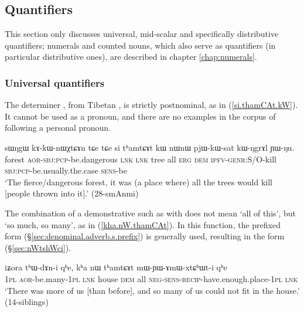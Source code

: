 \subsection{Quantifiers} \label{sec:quantifiers.determiners}
This section only discusses universal, mid-scalar and specifically distributive quantifiers; numerals and counted nouns, which also serve as quantifiers (in particular distributive ones), are described in chapter \ref{chap:numerals}.

\subsubsection{Universal quantifiers} \label{sec:universal.quant}
 
The determiner , from Tibetan , is strictly postnominal, as in (\ref{si.thamCAt.kW}). It cannot be used as a pronoun, and there are no examples in the corpus of  following a personal pronoun.

\begin{exe}
\ex \label{si.thamCAt.kW}
 \gll   sɯŋgɯ kɤ-kɯ-nɯχtɕɤn tɕe tɕe si tʰamtɕɤt kɯ nɯnɯ pjɯ-kɯ-sat kɯ-ŋgrɤl ɲɯ-ŋu. \\
 forest \textsc{aor}-\textsc{sbj}:\textsc{pcp}-be.dangerous \textsc{lnk} \textsc{lnk} tree all \textsc{erg} \textsc{dem} \textsc{ipfv}-\textsc{genr}:S/O-kill  \textsc{sbj}:\textsc{pcp}-be.usually.the.case \textsc{sens}-be \\
 \glt `The fierce/dangerous forest, it was (a place where) all the trees would kill [people thrown into it].' (28-smAnmi)
\end{exe}
 
The combination of a demonstrative such as  with   does not mean `all of this', but `so much, so many', as in (\ref{kha.nW.thamCAt}). In this function, the prefixed form  (§\ref{sec:denominal.adverb.s.prefix}) is generally used, resulting in the form  (§\ref{sec:nWtshWci}).

 
\begin{exe}
\ex \label{kha.nW.thamCAt}
 \gll iʑora tʰɯ-dɤn-i qʰe, kʰa nɯ tʰamtɕɤt mɯ-ɲɯ-ɤmɯ-xtɕʰɯt-i qʰe \\ 
 \textsc{1pl} \textsc{aor}-be.many-\textsc{1pl} \textsc{lnk} house \textsc{dem} all \textsc{neg}-\textsc{sens}-\textsc{recip}-have.enough.place-\textsc{1pl} \textsc{lnk} \\
 \glt `There was more of us [than before], and so many of us could not fit in the house.' (14-siblings) 
 \end{exe}
 

